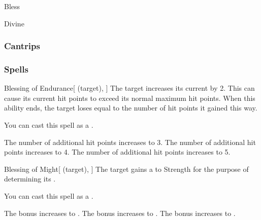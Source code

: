 \newpage
\begin{spellsection}{Bless}

\begin{spellheader}
\end{spellheader}


 Divine

\subsubsection{Cantrips}


\end{spellsection}


\subsubsection{Spells}


\lowercase{\hypertarget{spell:Blessing of Endurance}{}}\label{spell:Blessing of Endurance}
\begin{attuneability}[Rank 1]{\hypertarget{spell:Blessing of Endurance}{Blessing of Endurance}}[ (target), ]
The target increases its current  by 2.
This can cause its current hit points to exceed its normal maximum hit points.
When this ability ends, the target loses  equal to the number of hit points it gained this way.

You can cast this spell as a .

\rankline
{} The number of additional hit points increases to 3.
 The number of additional hit points increases to 4.
 The number of additional hit points increases to 5.
\end{attuneability}
\vspace{0.25em}



\lowercase{\hypertarget{spell:Blessing of Might}{}}\label{spell:Blessing of Might}
\begin{attuneability}[Rank 1]{\hypertarget{spell:Blessing of Might}{Blessing of Might}}[ (target), ]
The target gains a   to Strength for the purpose of determining its .

You can cast this spell as a .

\rankline
{} The bonus increases to .
 The bonus increases to .
 The bonus increases to .
\end{attuneability}
\vspace{0.25em}



